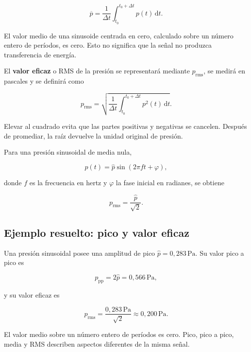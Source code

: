 \begin{equation}
    \overline p
      =\frac{1}{\Delta t}
       \int_{t_0}^{t_0+\Delta t}p(t)\,\mathrm{d}t.
    \label{eq:u4-presion-media}
\end{equation}

El valor medio de una sinusoide centrada en cero, calculado sobre un número
entero de períodos, es cero. Esto no significa que la señal no produzca
transferencia de energía.

El \textbf{valor eficaz} o RMS de la presión se representará mediante
\(p_\mathrm{rms}\), se medirá en pascales y se definirá como

\begin{equation}
    p_\mathrm{rms}
      =\sqrt{\frac{1}{\Delta t}
       \int_{t_0}^{t_0+\Delta t}p^2(t)\,\mathrm{d}t}.
    \label{eq:u4-presion-rms}
\end{equation}

Elevar al cuadrado evita que las partes positivas y negativas se cancelen.
Después de promediar, la raíz devuelve la unidad original de presión.

Para una presión sinusoidal de media nula,

\begin{equation}
    p(t)=\hat p\sin(2\pi ft+\varphi),
    \label{eq:u4-presion-sinusoidal}
\end{equation}

donde \(f\) es la frecuencia en hertz y \(\varphi\) la fase inicial en
radianes, se obtiene

\begin{equation}
    p_\mathrm{rms}=\frac{\hat p}{\sqrt{2}}.
    \label{eq:u4-rms-sinusoide}
\end{equation}

\subsection{Ejemplo resuelto: pico y valor eficaz}
\label{sec:u4-ejemplo-rms}

Una presión sinusoidal posee una amplitud de pico
\(\hat p=0{,}283\,\text{Pa}\). Su valor pico a pico es

\[
    p_\mathrm{pp}=2\hat p=0{,}566\,\text{Pa},
\]

y su valor eficaz es

\[
    p_\mathrm{rms}
      =\frac{0{,}283\,\text{Pa}}{\sqrt{2}}
      \approx0{,}200\,\text{Pa}.
\]

El valor medio sobre un número entero de períodos es cero. Pico, pico a pico,
media y RMS describen aspectos diferentes de la misma señal.

